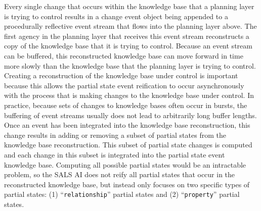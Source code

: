 Every single change that occurs within the knowledge base that a
planning layer is trying to control results in a change event object
being appended to a procedurally reflective event stream that flows
into the planning layer above.  The first agency in the planning layer
that receives this event stream reconstructs a copy of the knowledge
base that it is trying to control.  Because an event stream can be
buffered, this reconstructed knowledge base can move forward in time
more slowly than the knowledge base that the planning layer is trying
to control.  Creating a reconstruction of the knowledge base under
control is important because this allows the partial state event
reification to occur asynchronously with the process that is making
changes to the knowledge base under control.  In practice, because
sets of changes to knowledge bases often occur in bursts, the
buffering of event streams usually does not lead to arbitrarily long
buffer lengths.  Once an event has been integrated into the knowledge
base reconstruction, this change results in adding or removing a
subset of partial states from the knowledge base reconstruction.  This
subset of partial state changes is computed and each change in this
subset is integrated into the partial state event knowledge base.
Computing all possible partial states would be an intractable problem,
so the SALS AI does not reify all partial states that occur in the
reconstructed knowledge base, but instead only focuses on two specific
types of partial states: (1) ``{\tt{relationship}}'' partial states
and (2) ``{\tt{property}}'' partial states.

